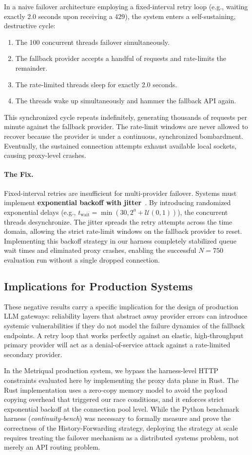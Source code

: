 In a naive failover architecture employing a fixed-interval retry loop (e.g., waiting exactly 2.0 seconds upon receiving a 429), the system enters a self-sustaining, destructive cycle:
\begin{enumerate}
    \item The 100 concurrent threads failover simultaneously.
    \item The fallback provider accepts a handful of requests and rate-limits the remainder.
    \item The rate-limited threads sleep for exactly 2.0 seconds.
    \item The threads wake up simultaneously and hammer the fallback API again.
\end{enumerate}
This synchronized cycle repeats indefinitely, generating thousands of requests per minute against the fallback provider. The rate-limit windows are never allowed to recover because the provider is under a continuous, synchronized bombardment. Eventually, the sustained connection attempts exhaust available local sockets, causing proxy-level crashes.

\paragraph{The Fix.}
Fixed-interval retries are insufficient for multi-provider failover. Systems must implement \textbf{exponential backoff with jitter}~\cite{aws-backoff}. By introducing randomized exponential delays (e.g., $t_{\text{wait}} = \min(30, 2^a + \mathcal{U}(0, 1))$), the concurrent threads desynchronize. The jitter spreads the retry attempts across the time domain, allowing the strict rate-limit windows on the fallback provider to reset. Implementing this backoff strategy in our harness completely stabilized queue wait times and eliminated proxy crashes, enabling the successful $N=750$ evaluation run without a single dropped connection.

\subsection{Implications for Production Systems}

These negative results carry a specific implication for the design of production LLM gateways: reliability layers that abstract away provider errors can introduce systemic vulnerabilities if they do not model the failure dynamics of the fallback endpoints. A retry loop that works perfectly against an elastic, high-throughput primary provider will act as a denial-of-service attack against a rate-limited secondary provider. 

In the Metriqual production system, we bypass the harness-level HTTP constraints evaluated here by implementing the proxy data plane in Rust. The Rust implementation uses a zero-copy memory model to avoid the payload copying overhead that triggered our race conditions, and it enforces strict exponential backoff at the connection pool level. While the Python benchmark harness (\textit{continuity-bench}) was necessary to formally measure and prove the correctness of the History-Forwarding strategy, deploying the strategy at scale requires treating the failover mechanism as a distributed systems problem, not merely an API routing problem.
